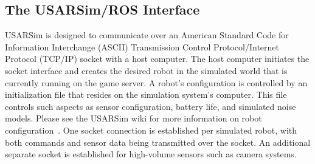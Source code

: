 \subsection{The USARSim/ROS Interface}
USARSim is designed to communicate over an American Standard Code for Information Interchange (ASCII) Transmission Control Protocol/Internet Protocol (TCP/IP) socket with a host computer. The host computer initiates the socket interface and creates the desired robot in the simulated world that is currently running on the game server. A robot's configuration is controlled by an initialization file that resides on the simulation system's computer. This file controls such aspects as sensor configuration, battery life, and simulated noise models. Please see the USARSim wiki for more information on robot configuration~\cite{USARSimWeb}.  One socket connection is established per simulated robot, with both commands and sensor data being transmitted over the socket. An additional separate socket is established for high-volume sensors such as camera systems.
%
%  
